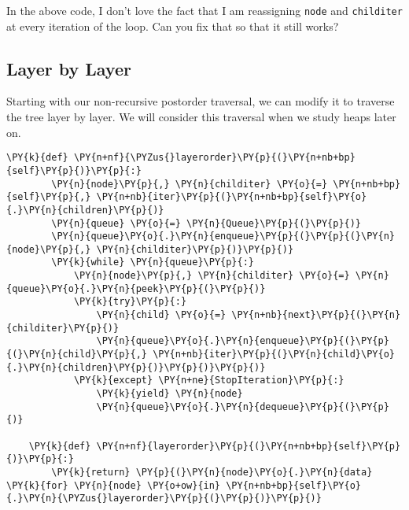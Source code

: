 In the above code, I don’t love the fact that I am reassigning \texttt{node} and \texttt{childiter} at every iteration of the loop.  Can you fix that so that it still works?

\subsection{Layer by Layer}


Starting with our non-recursive postorder traversal, we can modify it to traverse the tree layer by layer.
We will consider this traversal when we study heaps later on.

\begin{Verbatim}[commandchars=\\\{\}]
    \PY{k}{def} \PY{n+nf}{\PYZus{}layerorder}\PY{p}{(}\PY{n+nb+bp}{self}\PY{p}{)}\PY{p}{:}
        \PY{n}{node}\PY{p}{,} \PY{n}{childiter} \PY{o}{=} \PY{n+nb+bp}{self}\PY{p}{,} \PY{n+nb}{iter}\PY{p}{(}\PY{n+nb+bp}{self}\PY{o}{.}\PY{n}{children}\PY{p}{)}
        \PY{n}{queue} \PY{o}{=} \PY{n}{Queue}\PY{p}{(}\PY{p}{)}
        \PY{n}{queue}\PY{o}{.}\PY{n}{enqueue}\PY{p}{(}\PY{p}{(}\PY{n}{node}\PY{p}{,} \PY{n}{childiter}\PY{p}{)}\PY{p}{)}
        \PY{k}{while} \PY{n}{queue}\PY{p}{:}
            \PY{n}{node}\PY{p}{,} \PY{n}{childiter} \PY{o}{=} \PY{n}{queue}\PY{o}{.}\PY{n}{peek}\PY{p}{(}\PY{p}{)}
            \PY{k}{try}\PY{p}{:}
                \PY{n}{child} \PY{o}{=} \PY{n+nb}{next}\PY{p}{(}\PY{n}{childiter}\PY{p}{)}
                \PY{n}{queue}\PY{o}{.}\PY{n}{enqueue}\PY{p}{(}\PY{p}{(}\PY{n}{child}\PY{p}{,} \PY{n+nb}{iter}\PY{p}{(}\PY{n}{child}\PY{o}{.}\PY{n}{children}\PY{p}{)}\PY{p}{)}\PY{p}{)}
            \PY{k}{except} \PY{n+ne}{StopIteration}\PY{p}{:}
                \PY{k}{yield} \PY{n}{node}
                \PY{n}{queue}\PY{o}{.}\PY{n}{dequeue}\PY{p}{(}\PY{p}{)}                 

    \PY{k}{def} \PY{n+nf}{layerorder}\PY{p}{(}\PY{n+nb+bp}{self}\PY{p}{)}\PY{p}{:}
        \PY{k}{return} \PY{p}{(}\PY{n}{node}\PY{o}{.}\PY{n}{data} \PY{k}{for} \PY{n}{node} \PY{o+ow}{in} \PY{n+nb+bp}{self}\PY{o}{.}\PY{n}{\PYZus{}layerorder}\PY{p}{(}\PY{p}{)}\PY{p}{)}
\end{Verbatim}
